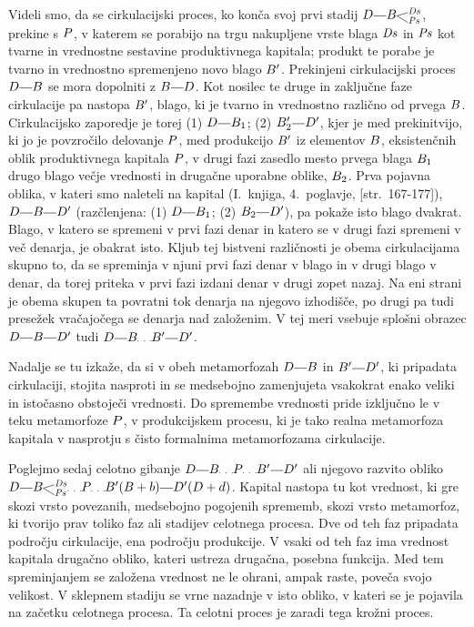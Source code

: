 \documentclass[kapital_02.tex]{subfiles}
\begin{document}
Videli smo, da se cirkulacijski proces, ko konča svoj prvi stadij \(\KPED\KPEcrta\KPEBrazcepDsPs\), prekine s \(P\), v katerem se porabijo na trgu nakupljene vrste blaga \(\mathit{Ds}\) in \(\mathit{Ps}\) kot tvarne in vrednostne sestavine produktivnega kapitala; produkt te porabe je tvarno in vrednostno spremenjeno novo blago \(B'\). Prekinjeni cirkulacijski proces \(\KPED\KPEcrta\KPEB\) se mora dopolniti z \(\KPEB\KPEcrta\KPED\). Kot nosilec te druge in zaključne faze cirkulacije pa nastopa \(B'\), blago, ki je tvarno in vrednostno različno od prvega \(B\). Cirkulacijsko zaporedje je torej (1) \(\KPED\KPEcrta\KPEB_1\); (2) \(\KPEB'_2\KPEcrta\KPED'\), kjer je med prekinitvijo, ki jo je povzročilo delovanje \(P\), med produkcijo \(B'\) iz elementov \(B\), eksistenčnih oblik produktivnega kapitala \(P\), v drugi fazi zasedlo mesto prvega blaga \(B_1\) drugo blago večje vrednosti in drugačne uporabne oblike, \(B_2\). Prva pojavna oblika, v kateri smo naleteli na kapital (I.~knjiga, 4.~poglavje, [str.\ 167-177]), \(\KPED\KPEcrta\KPEB\KPEcrta\KPED'\) (razčlenjena: (1) \(\KPED\KPEcrta\KPEB_1\); (2) \(\KPEB_2\KPEcrta\KPED'\)), pa pokaže isto blago dvakrat. Blago, v katero se spremeni v prvi fazi denar in katero se v drugi fazi spremeni v več denarja, je obakrat isto. Kljub tej bistveni različnosti je obema cirkulacijama skupno to, da se spreminja v njuni prvi fazi denar v blago in v drugi blago v denar, da torej priteka v prvi fazi izdani denar v drugi zopet nazaj. Na eni strani je obema skupen ta povratni tok denarja na njegovo izhodišče, po drugi pa tudi presežek vračajočega se denarja nad založenim. V tej meri vsebuje splošni obrazec \(\KPED\KPEcrta\KPEB\KPEcrta\KPED'\) tudi \(\KPED\KPEcrta\KPEB\KPEpike\KPEB'\KPEcrta\KPED'\).

Nadalje se tu izkaže, da si v obeh metamorfozah \(\KPED\KPEcrta\KPEB\) in \(\KPEB'\KPEcrta\KPED'\), ki pripadata cirkulaciji, stojita nasproti in se medsebojno zamenjujeta vsakokrat enako veliki in istočasno obstoječi vrednosti. Do spremembe vrednosti pride izključno le v teku metamorfoze \(P\), v produkcijskem procesu, ki je tako realna metamorfoza kapitala v nasprotju s čisto formalnima metamorfozama cirkulacije.

Poglejmo sedaj celotno gibanje \(\KPED\KPEcrta\KPEB\KPEpike\KPEP\KPEpike\KPEB'\KPEcrta\KPED'\) ali njegovo razvito obliko \(\KPED\KPEcrta\KPEBrazcepDsPs\KPEpike\KPEP\KPEpike\KPEB'(\KPEB + \KPEb)\KPEcrta\KPED'(\KPED + \KPEd)\). Kapital nastopa tu kot vrednost, ki gre skozi vrsto povezanih, medsebojno pogojenih sprememb, skozi vrsto metamorfoz, ki tvorijo prav toliko faz ali stadijev celotnega procesa. Dve od teh faz pripadata področju cirkulacije, ena področju produkcije. V vsaki od teh faz ima vrednost kapitala drugačno obliko, kateri ustreza drugačna, posebna funkcija. Med tem spreminjanjem se založena vrednost ne le ohrani, ampak raste, poveča svojo velikost. V sklepnem stadiju se vrne nazadnje v isto obliko, v kateri se je pojavila na začetku celotnega procesa. Ta celotni proces je zaradi tega krožni proces.
\end{document}
